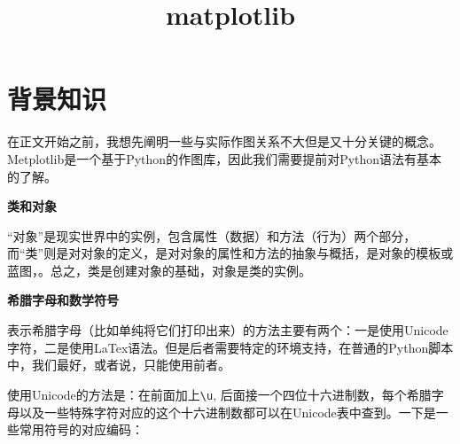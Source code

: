 \documentclass[12pt]{article}
\title{matplotlib}
\begin{document}
\tableofcontents
\newpage
\section{背景知识}
在正文开始之前，我想先阐明一些与实际作图关系不大但是又十分关键的概念。Metplotlib是一个基于Python的作图库，因此我们需要提前对Python语法有基本的了解。

\noindent \textbf{\large 类和对象}

“对象”是现实世界中的实例，包含属性（数据）和方法（行为）两个部分，而“类”则是对对象的定义，是对对象的属性和方法的抽象与概括，是对象的模板或蓝图，。总之，类是创建对象的基础，对象是类的实例。

\noindent \textbf{\large 希腊字母和数学符号}

表示希腊字母（比如单纯将它们打印出来）的方法主要有两个：一是使用Unicode字符，二是使用LaTex语法。但是后者需要特定的环境支持，在普通的Python脚本中，我们最好，或者说，只能使用前者。

使用Unicode的方法是：在前面加上\verb|\u|, 后面接一个四位十六进制数，每个希腊字母以及一些特殊字符对应的这个十六进制数都可以在Unicode表中查到。一下是一些常用符号的对应编码：
\end{document}
